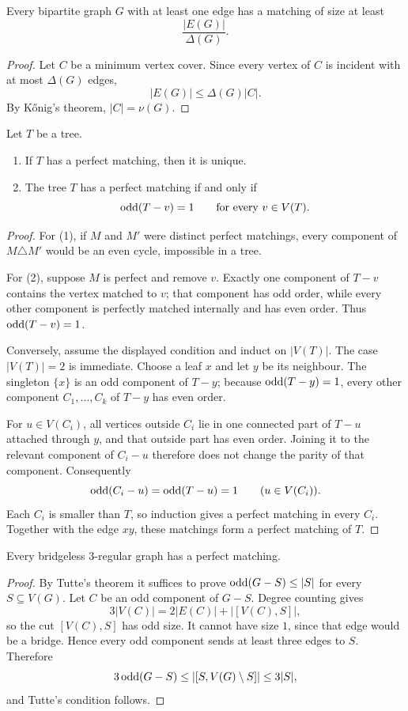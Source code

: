\begin{noteexercise}
Every bipartite graph $G$ with at least one edge has a matching of size at
least
\[
  \frac{|E(G)|}{\Delta(G)}.
\]
\end{noteexercise}
\begin{proof}
Let $C$ be a minimum vertex cover.  Since every vertex of $C$ is incident with
at most $\Delta(G)$ edges,
\[
  |E(G)|\le\Delta(G)|C|.
\]
By K\H{o}nig's theorem, $|C|=\nu(G)$.
\end{proof}
\begin{noteexercise}
Let $T$ be a tree.
\begin{enumerate}
  \item If $T$ has a perfect matching, then it is unique.
  \item The tree $T$ has a perfect matching if and only if
        \[
          \operatorname{odd}(T-v)=1\qquad\text{for every }v\in V(T).
        \]
\end{enumerate}
\end{noteexercise}
\begin{proof}
For (1), if $M$ and $M'$ were distinct perfect matchings, every component of
$M\triangle M'$ would be an even cycle, impossible in a tree.

For (2), suppose $M$ is perfect and remove $v$.  Exactly one component of
$T-v$ contains the vertex matched to $v$; that component has odd order, while
every other component is perfectly matched internally and has even order.
Thus $\operatorname{odd}(T-v)=1$.

Conversely, assume the displayed condition and induct on $|V(T)|$.  The case
$|V(T)|=2$ is immediate.  Choose a leaf $x$ and let $y$ be its neighbour.
The singleton $\{x\}$ is an odd component of $T-y$; because
$\operatorname{odd}(T-y)=1$, every other component $C_1,\dots,C_k$ of $T-y$ has even
order.

For $u\in V(C_i)$, all vertices outside $C_i$ lie in one connected part of
$T-u$ attached through $y$, and that outside part has even order.  Joining it
to the relevant component of $C_i-u$ therefore does not change the parity of
that component.  Consequently
\[
  \operatorname{odd}(C_i-u)=\operatorname{odd}(T-u)=1
  \qquad (u\in V(C_i)).
\]
Each $C_i$ is smaller than $T$, so induction gives a perfect matching in every
$C_i$.  Together with the edge $xy$, these matchings form a perfect matching
of $T$.
\end{proof}
\begin{noteexercise}
Every bridgeless $3$-regular graph has a perfect matching.
\end{noteexercise}
\begin{proof}
By Tutte's theorem it suffices to prove
$\operatorname{odd}(G-S)\le|S|$ for every $S\subseteq V(G)$.  Let $C$ be an odd component
of $G-S$.  Degree counting gives
\[
  3|V(C)|=2|E(C)|+|[V(C),S]|,
\]
so the cut $[V(C),S]$ has odd size.  It cannot have size $1$, since that edge
would be a bridge.  Hence every odd component sends at least three edges to
$S$.  Therefore
\[
  3\operatorname{odd}(G-S)
  \le |[S,V(G)\setminus S]|
  \le 3|S|,
\]
and Tutte's condition follows.
\end{proof}
